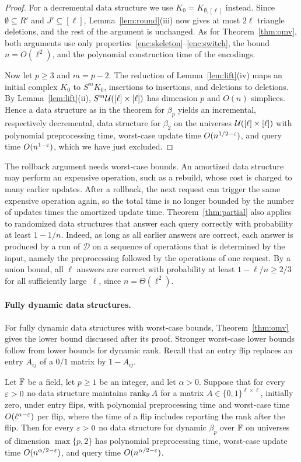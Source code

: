 \begin{proof}
For a decremental data structure we use $K_0=K_{\emptyset,[\ell]}$ instead.
Since $\emptyset\subseteq R'$ and $J'\subseteq[\ell]$, Lemma~\ref{lem:round}(iii) now gives at most $2\ell$ triangle deletions, and the rest of the argument is unchanged.
As for Theorem~\ref{thm:omv}, both arguments use only properties~\ref{enc:skeleton}--\ref{enc:switch}, the bound $n=O(\ell^2)$, and the polynomial construction time of the encodings.

Now let $p\ge3$ and $m=p-2$.
The reduction of Lemma~\ref{lem:lift}(iv) maps an initial complex $K_0$ to $S^mK_0$, insertions to insertions, and deletions to deletions.
By Lemma~\ref{lem:lift}(ii), $S^m\mathcal{U}([\ell]\times[\ell])$ has dimension $p$ and $O(n)$ simplices.
Hence a data structure as in the theorem for $\beta_p$ yields an incremental, respectively decremental, data structure for $\beta_2$ on the universes $\mathcal{U}([\ell]\times[\ell])$ with polynomial preprocessing time, worst-case update time $O(n^{1/2-\varepsilon})$, and query time $O(n^{1-\varepsilon})$, which we have just excluded.
\end{proof}

The rollback argument needs worst-case bounds.
An amortized data structure may perform an expensive operation, such as a rebuild, whose cost is charged to many earlier updates.
After a rollback, the next request can trigger the same expensive operation again, so the total time is no longer bounded by the number of updates times the amortized update time.
Theorem~\ref{thm:partial} also applies to randomized data structures that answer each query correctly with probability at least $1-1/n$.
Indeed, as long as all earlier answers are correct, each answer is produced by a run of $\mathcal{D}$ on a sequence of operations that is determined by the input, namely the preprocessing followed by the operations of one request.
By a union bound, all $\ell$ answers are correct with probability at least $1-\ell/n\ge2/3$ for all sufficiently large~$\ell$, since $n=\Theta(\ell^2)$.

\paragraph{Fully dynamic data structures.}
For fully dynamic data structures with worst-case bounds, Theorem~\ref{thm:omv} gives the lower bound discussed after its proof.
Stronger worst-case lower bounds follow from lower bounds for dynamic rank.
Recall that an entry flip replaces an entry $A_{ij}$ of a $0/1$ matrix by $1-A_{ij}$.

\begin{theorem}\label{thm:worstcase}
Let $\mathbb{F}$ be a field, let $p\ge1$ be an integer, and let $\alpha>0$.
Suppose that for every $\varepsilon>0$ no data structure maintains $\operatorname{rank}_{\mathbb{F}}A$ for a matrix $A\in\{0,1\}^{\ell\times\ell}$, initially zero, under entry flips, with polynomial preprocessing time and worst-case time $O(\ell^{\alpha-\varepsilon})$ per flip, where the time of a flip includes reporting the rank after the flip.
Then for every $\varepsilon>0$ no data structure for dynamic $\beta_p$ over $\mathbb{F}$ on universes of dimension $\max\{p,2\}$ has polynomial preprocessing time, worst-case update time $O(n^{\alpha/2-\varepsilon})$, and query time $O(n^{\alpha/2-\varepsilon})$.
\end{theorem}

